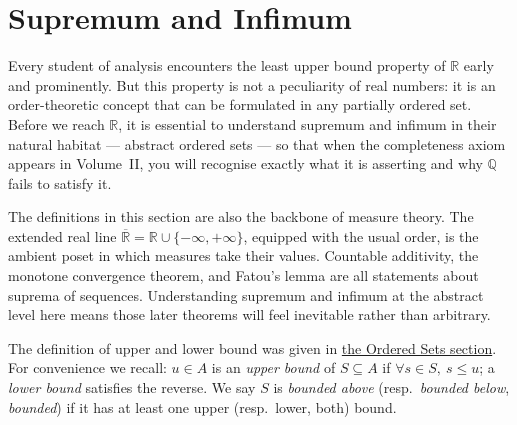 
\section{Supremum and Infimum}\label{sec:sup-inf}



\begin{exposition}
Every student of analysis encounters the least upper bound property of
$\mathbb{R}$ early and prominently.  But this property is not a peculiarity
of real numbers: it is an order-theoretic concept that can be formulated in
any partially ordered set.  Before we reach $\mathbb{R}$, it is essential to
understand supremum and infimum in their natural habitat — abstract ordered
sets — so that when the completeness axiom appears in Volume~II, you will
recognise exactly what it is asserting and why $\mathbb{Q}$ fails to satisfy it.
\end{exposition}

\begin{exposition}
The definitions in this section are also the backbone of measure theory.
The extended real line $\overline{\mathbb{R}} = \mathbb{R} \cup \{-\infty,
+\infty\}$, equipped with the usual order, is the ambient poset in which
measures take their values.  Countable additivity, the monotone convergence
theorem, and Fatou's lemma are all statements about suprema of sequences.
Understanding supremum and infimum at the abstract level here means those
later theorems will feel inevitable rather than arbitrary.
\end{exposition}


\begin{exposition}
The definition of upper and lower bound was given in
\hyperref[def:bounds]{the Ordered Sets section}.  For convenience
we recall: $u \in A$ is an \emph{upper bound} of $S \subseteq A$ if
$\forall s \in S,\ s \leq u$; a \emph{lower bound} satisfies the
reverse.  We say $S$ is \emph{bounded above} (resp.\ \emph{bounded below},
\emph{bounded}) if it has at least one upper (resp.\ lower, both) bound.
\end{exposition}

